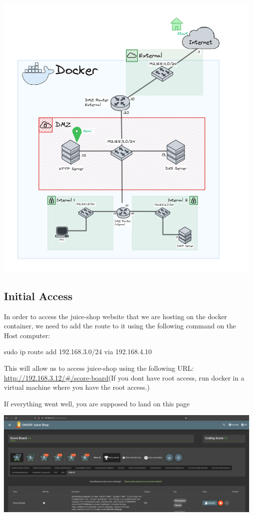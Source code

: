 \documentclass[a4paper,11pt,singlespacing]{article}
\newenvironment{Shaded}{}{}
\newcommand{\NormalTok}[1]{#1}
\begin{document}
\includegraphics{Images/Diagram2.png}
\newpage

\subsection{Initial Access}\label{initial-access}

In order to access the juice-shop website that we are hosting on the
docker container, we need to add the route to it using the following
command on the Host computer:

\begin{Shaded}
\begin{Highlighting}[]
\NormalTok{sudo ip route add 192.168.3.0/24 via 192.168.4.10}
\end{Highlighting}
\end{Shaded}

This will allow us to access juice-shop using the following URL:
\url{http://192.168.3.12/\#/score-board}(If you dont have root access,
run docker in a virtual machine where you have the root access.)

If everything went well, you are supposed to land on this page

\includegraphics{Images/Image11.png}
\end{document}
